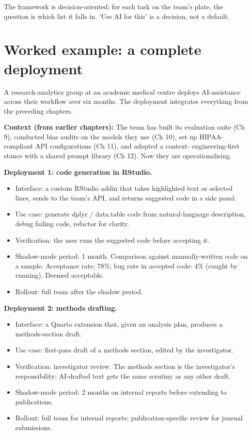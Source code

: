 \documentclass[
  letterpaper,
  11pt]{scrbook}
\providecommand{\tightlist}{%
  \setlength{\itemsep}{0pt}\setlength{\parskip}{0pt}}
\begin{document}
The framework is decision-oriented; for each task on the team's plate,
the question is which list it falls in. `Use AI for this' is a decision,
not a default.

\section{Worked example: a complete
deployment}\label{worked-example-a-complete-deployment}

A research-analytics group at an academic medical centre deploys
AI-assistance across their workflow over six months. The deployment
integrates everything from the preceding chapters.

\textbf{Context (from earlier chapters):} The team has built its
evaluation suite (Ch 9), conducted bias audits on the models they use
(Ch 10), set up HIPAA-compliant API configurations (Ch 11), and adopted
a context- engineering-first stance with a shared prompt library (Ch
12). Now they are operationalising.

\textbf{Deployment 1: code generation in RStudio.}

\begin{itemize}
\tightlist
\item
  Interface: a custom RStudio addin that takes highlighted text or
  selected lines, sends to the team's API, and returns suggested code in
  a side panel.
\item
  Use case: generate dplyr / data.table code from natural-language
  description, debug failing code, refactor for clarity.
\item
  Verification: the user runs the suggested code before accepting it.
\item
  Shadow-mode period: 1 month. Comparison against manually-written code
  on a sample. Acceptance rate: 78\%; bug rate in accepted code: 4\%
  (caught by running). Deemed acceptable.
\item
  Rollout: full team after the shadow period.
\end{itemize}

\textbf{Deployment 2: methods drafting.}

\begin{itemize}
\tightlist
\item
  Interface: a Quarto extension that, given an analysis plan, produces a
  methods-section draft.
\item
  Use case: first-pass draft of a methods section, edited by the
  investigator.
\item
  Verification: investigator review. The methods section is the
  investigator's responsibility; AI-drafted text gets the same scrutiny
  as any other draft.
\item
  Shadow-mode period: 2 months on internal reports before extending to
  publications.
\item
  Rollout: full team for internal reports; publication-specific review
  for journal submissions.
\end{itemize}
\end{document}
